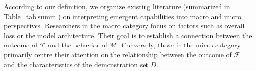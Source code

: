 According to our definition, we organize existing literature (summarized in Table~\ref{tab:summ}) on interpreting emergent capabilities into macro and micro perspectives. 
Researchers in the macro category focus on factors such as overall loss or the model architecture. Their goal is to establish a connection between the outcome of $\mathcal F$ and the behavior of $\mathcal M$.
Conversely, those in the micro category primarily centre their attention on the relationship between the outcome of $\mathcal F$ and the characteristics of the demonstration set $D$.
